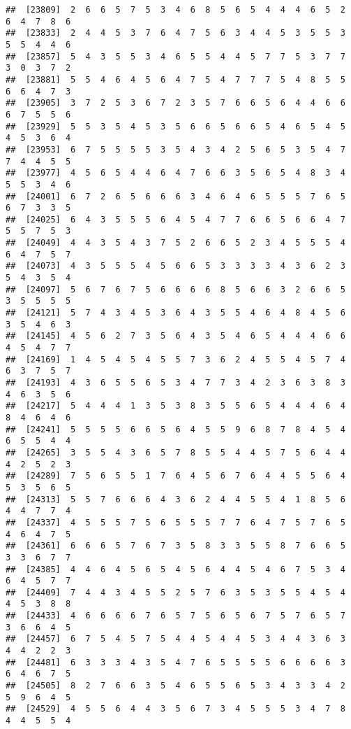 \documentclass[
]{book}
\begin{document}
\begin{verbatim}
##  [23809]  2  6  6  5  7  5  3  4  6  8  5  6  5  4  4  4  6  5  2  6  4  7  8  6
##  [23833]  2  4  4  5  3  7  6  4  7  5  6  3  4  4  5  3  5  5  3  5  5  4  4  6
##  [23857]  5  4  3  5  5  3  4  6  5  5  4  4  5  7  7  5  3  7  7  3  0  3  7  2
##  [23881]  5  5  4  6  4  5  6  4  7  5  4  7  7  7  5  4  8  5  5  6  6  4  7  3
##  [23905]  3  7  2  5  3  6  7  2  3  5  7  6  6  5  6  4  4  6  6  6  7  5  5  6
##  [23929]  5  5  3  5  4  5  3  5  6  6  5  6  6  5  4  6  5  4  5  4  5  3  6  4
##  [23953]  6  7  5  5  5  5  3  5  4  3  4  2  5  6  5  3  5  4  7  7  4  4  5  5
##  [23977]  4  5  6  5  4  4  6  4  7  6  6  3  5  6  5  4  8  3  4  5  5  3  4  6
##  [24001]  6  7  2  6  5  6  6  6  3  4  6  4  6  5  5  5  7  6  5  6  7  3  3  5
##  [24025]  6  4  3  5  5  5  6  4  5  4  7  7  6  6  5  6  6  4  7  5  5  7  5  3
##  [24049]  4  4  3  5  4  3  7  5  2  6  6  5  2  3  4  5  5  5  4  6  4  7  5  7
##  [24073]  4  3  5  5  5  4  5  6  6  5  3  3  3  3  4  3  6  2  3  5  4  3  5  4
##  [24097]  5  6  7  6  7  5  6  6  6  6  8  5  6  6  3  2  6  6  5  3  5  5  5  5
##  [24121]  5  7  4  3  4  5  3  6  4  3  5  5  4  6  4  8  4  5  6  3  5  4  6  3
##  [24145]  4  5  6  2  7  3  5  6  4  3  5  4  6  5  4  4  4  6  6  4  5  4  7  7
##  [24169]  1  4  5  4  5  4  5  5  7  3  6  2  4  5  5  4  5  7  4  6  3  7  5  7
##  [24193]  4  3  6  5  5  6  5  3  4  7  7  3  4  2  3  6  3  8  3  4  6  3  5  6
##  [24217]  5  4  4  4  1  3  5  3  8  3  5  5  6  5  4  4  4  6  4  8  4  6  4  6
##  [24241]  5  5  5  5  6  6  5  6  4  5  5  9  6  8  7  8  4  5  4  6  5  5  4  4
##  [24265]  3  5  5  4  3  6  5  7  8  5  5  4  4  5  7  5  6  4  4  4  2  5  2  3
##  [24289]  7  5  6  5  5  1  7  6  4  5  6  7  6  4  4  5  5  6  4  5  3  5  6  5
##  [24313]  5  5  7  6  6  6  4  3  6  2  4  4  5  5  4  1  8  5  6  4  4  7  7  4
##  [24337]  4  5  5  5  7  5  6  5  5  5  7  7  6  4  7  5  7  6  5  4  6  4  7  5
##  [24361]  6  6  6  5  7  6  7  3  5  8  3  3  5  5  8  7  6  6  5  3  3  6  7  7
##  [24385]  4  4  6  4  5  6  5  4  5  6  4  4  5  4  6  7  5  3  4  6  4  5  7  7
##  [24409]  7  4  4  3  4  5  5  2  5  7  6  3  5  3  5  5  4  5  4  4  5  3  8  8
##  [24433]  4  6  6  6  6  7  6  5  7  5  6  5  6  7  5  7  6  5  7  3  6  6  4  5
##  [24457]  6  7  5  4  5  7  5  4  4  5  4  4  5  3  4  4  3  6  3  4  4  2  2  3
##  [24481]  6  3  3  3  4  3  5  4  7  6  5  5  5  5  6  6  6  6  3  6  4  6  7  5
##  [24505]  8  2  7  6  6  3  5  4  6  5  5  6  5  3  4  3  3  4  2  5  9  6  4  5
##  [24529]  4  5  5  6  4  4  3  5  6  7  3  4  5  5  5  3  4  7  8  4  4  5  5  4

\end{verbatim}
\end{document}
